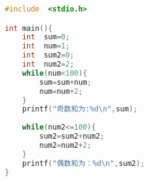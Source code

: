 \begin{lstlisting}[language={c++}]
#include  <stdio.h>

int main(){
    int  sum=0;
    int  num=1;
    int  sum2=0;
    int  num2=2;
    while(num<100){
        sum=sum+num;
        num=num+2;
    }
    printf("奇数和为:%d\n",sum);
    
    while(num2<=100){
        sum2=sum2+num2;
        num2=num2+2;
    }
    printf("偶数和为：%d\n",sum2);
}
\end{lstlisting}

\inputminted[breaklines=true]{c}{source/01.c}
